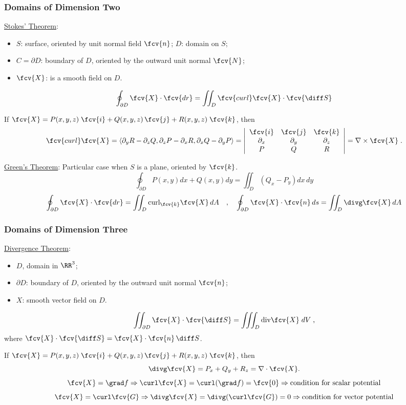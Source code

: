 \begin{frame}
  \frametitle{Domains of Dimension Two}

\underline{Stokes' Theorem}:
\begin{itemize}
  \item $S$: surface, oriented by unit normal field $\fcv{n}$; $D$: domain on $S$;
  \item $C=\partial D$: boundary of $D$, oriented by the outward unit normal $\fcv{N}$;
  \item $\fcv{X}$: is a smooth field on $D$.
\end{itemize}
$$
  \oint_{\partial D} \fcv{X} \cdot \fcv{dr} = \iint_D \fcv{curl} \fcv{X} \cdot \fcv{\diff S}
$$

If $\fcv{X} = P(x,y,z)\; \fcv{i} + Q(x,y,z)\, \fcv{j} + R(x,y,z)\; \fcv{k}$, then
%
$$ \fcv{curl} \fcv{X} =\langle \partial_y R - \partial_z Q, \partial_z P - \partial_x R, \partial_x Q - \partial_y P\rangle = \left| \begin{array}{ccc}
  \fcv{i} & \fcv{j} & \fcv{k} \\
  \partial_x & \partial_y & \partial_z \\
  P & Q & R
\end{array}\right| = \nabla \times \fcv{X}\; .$$

\underline{Green's Theorem}: Particular case when $S$ is a plane, oriented by $\fcv{k}$.
$$
  \oint_{\partial D} P(x,y) dx + Q(x,y) dy = \iint_D \left( Q_x - P_y\right) dx\,dy
$$
$$
  \oint_{\partial D} \fcv{X} \cdot \fcv{dr} = \iint_D \text{curl}_{\fcv{k}} \fcv{X}\, dA \quad , \quad
  \oint_{\partial D} \fcv{X} \cdot \fcv{n}\,ds = \iint_D \divg  \fcv{X}\, dA
$$
\end{frame}

\begin{frame}
  \frametitle{Domains of Dimension Three}

  \underline{Divergence Theorem}:
   \begin{itemize}
     \item $D$, domain in $\RR^3$;
     \item $\partial D$: boundary of $D$, oriented by the outward unit normal $\fcv{n}$;
     \item $X$: smooth vector field on $D$.
   \end{itemize}
%
$$
  \iint_{\partial D} \fcv{X} \cdot \fcv{\diff S} = \iiint_D \text{div} \fcv{X} \;dV \; ,
$$
%
where $\fcv{X} \cdot \fcv{\diff S} = \fcv{X} \cdot \fcv{n} \, \diff S$.

\medskip
If $\fcv{X} = P(x,y,z)\; \fcv{i} + Q(x,y,z)\, \fcv{j} + R(x,y,z)\; \fcv{k}$, then
%
$$\divg \fcv{X} = P_x + Q_y + R_z = \nabla \cdot \fcv{X}.$$
%
$$\fcv{X}=\grad f \Rightarrow \curl \fcv{X} = \curl (\grad f) = \fcv{0} \Rightarrow \text{condition for scalar potential}$$
%
$$\fcv{X}=\curl \fcv{G} \Rightarrow \divg \fcv{X} = \divg (\curl \fcv{G}) = 0 \Rightarrow \text{condition for vector potential}$$

\end{frame}

